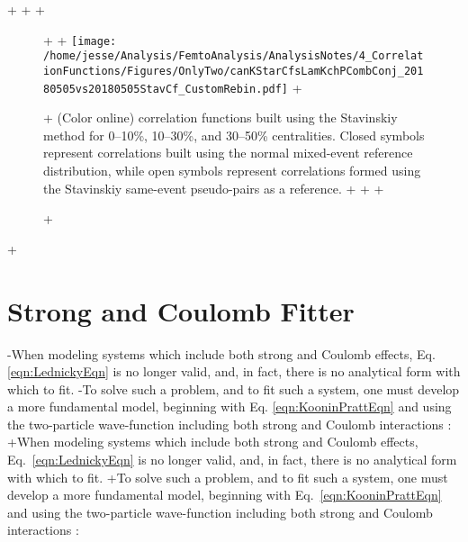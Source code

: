 \begin{table}[htbp]
\begin{table}[htbp]
\begin{comment}
+  Closed (red) symbols represent correlations built using the normal mixed-event reference distribution, while open (green) symbols represent correlations formed using the Stavinskiy same-event pseudo-pairs as a reference.
+  }
   \label{fig:StavCfs_Correct_LamKchP}
 \end{figure}
-
-Now, one must be somewhat careful when applying this Stavinskiy method.  
-To obtain correct results, the pseudo-pairs must be run through the same pair cuts used for the real pairs in the analyses.  
-In an ideal world, the pair cut would only remove truly bad pairs results from splitting, merging, etc.  
-In the real world, the pair cut always throws out some of the good with the bad.  
-For the pseudo-pairs to form a reliable reference, they too must experience the pair cut, and the loss of ``good'' pseudo-pairs.  
-This issue affected mainly the \LamKchP \& \ALamKchM system in this analysis.
+\end{comment}
+%
+
+\begin{figure}[h!]
+  \centering
+  \texttt{[image: /home/jesse/Analysis/FemtoAnalysis/AnalysisNotes/4\_CorrelationFunctions/Figures/OnlyTwo/canKStarCfsLamKchPCombConj\_20180505vs20180505StavCf\_CustomRebin.pdf]}
+  \caption[\LamKchP Stavinskiy Correlation Functions]
+  {
+  (Color online) \LamKchPALamKchM correlation functions built using the Stavinskiy method for 0--10\%, 10--30\%, and 30--50\% centralities.  Closed symbols represent correlations built using the normal mixed-event reference distribution, while open symbols represent correlations formed using the Stavinskiy same-event pseudo-pairs as a reference.
+  }
+  \label{fig:StavCfs_Correct_LamKchP}
+\end{figure} 
+
 
 
 
 \section{Strong and Coulomb Fitter}
 \label{App:CoulombFitter}
 
-When modeling systems which include both strong and Coulomb effects, Eq. \ref{eqn:LednickyEqn} is no longer valid, and, in fact, there is no analytical form with which to fit.
-To solve such a problem, and to fit such a system, one must develop a more fundamental model, beginning with Eq. \ref{eqn:KooninPrattEqn} and using the two-particle wave-function including both strong and Coulomb interactions \cite{Lednicky:2005tb}:
+When modeling systems which include both strong and Coulomb effects, Eq.\ \ref{eqn:LednickyEqn} is no longer valid, and, in fact, there is no analytical form with which to fit.
+To solve such a problem, and to fit such a system, one must develop a more fundamental model, beginning with Eq.\ \ref{eqn:KooninPrattEqn} and using the two-particle wave-function including both strong and Coulomb interactions \cite{Lednicky:2005tb}:
 

\end{table}
\end{table}

